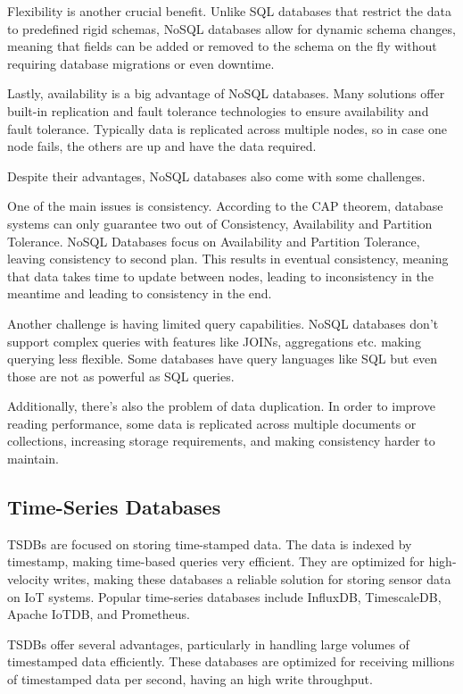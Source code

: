 Flexibility is another crucial benefit.
Unlike \gls{SQL} databases that restrict the data to predefined rigid schemas,
\gls{NoSQL} databases allow for dynamic schema changes, meaning that fields can
be added or removed to the schema on the fly without requiring database
migrations or even downtime\cite{Yadav2024}.

Lastly, availability is a big advantage of \gls{NoSQL} databases.
Many solutions offer built-in replication and fault tolerance
technologies to ensure availability and fault tolerance. Typically data is
replicated across multiple nodes, so in case one node fails, the others
are up and have the data required\cite{Yadav2024}.

Despite their advantages, \gls{NoSQL} databases also come with some challenges.

One of the main issues is consistency.
According to the \gls{CAP} theorem, database systems can only guarantee two out of
Consistency, Availability and Partition Tolerance. \gls{NoSQL} Databases focus on
Availability and Partition Tolerance, leaving consistency to second plan.
This results in eventual consistency, meaning that data takes time to update
between nodes, leading to inconsistency in the meantime and leading to
consistency in the end\cite{Yadav2024}.

Another challenge is having limited query capabilities.
\gls{NoSQL} databases don't support complex queries with features like JOINs,
aggregations etc. making querying less flexible. Some databases have query
languages like \gls{SQL} but even those are not as powerful as \gls{SQL} queries.

Additionally, there's also the problem of data duplication.
In order to improve reading performance, some data is replicated across
multiple documents or collections, increasing storage requirements, and
making consistency harder to maintain\cite{bdcc7020097}.
\subsection{Time-Series Databases}
\gls{TSDB}s are focused on storing time-stamped data. The
data is indexed by timestamp, making time-based queries very efficient. They are
optimized for high-velocity writes, making these databases a reliable solution
for storing sensor data on \gls{IoT} systems. Popular time-series databases include
InfluxDB, TimescaleDB, Apache IoTDB, and Prometheus\cite{wang2023apache, InfluxDB}.

\gls{TSDB}s offer several advantages, particularly in handling large volumes
of timestamped data efficiently. These databases are optimized for receiving
millions of timestamped data per second, having an high write throughput.

